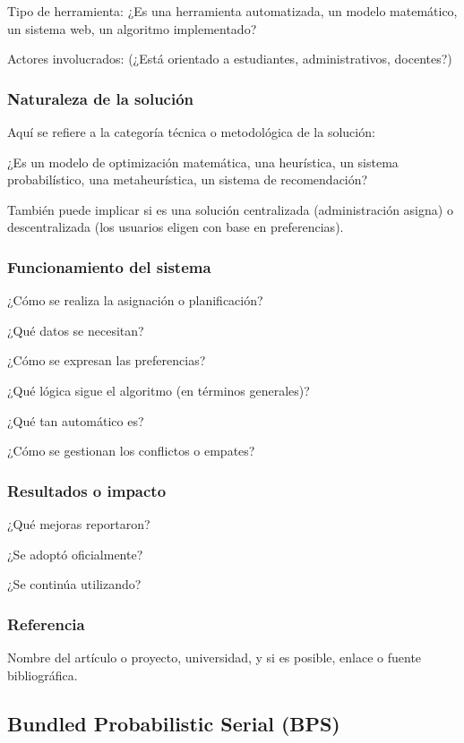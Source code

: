 \documentclass{article}
\begin{document}
Tipo de herramienta: ¿Es una herramienta automatizada, un modelo matemático, un sistema web, un algoritmo implementado?

Actores involucrados: (¿Está orientado a estudiantes, administrativos, docentes?)

\subsubsection{Naturaleza de la solución}
Aquí se refiere a la categoría técnica o metodológica de la solución:

¿Es un modelo de optimización matemática, una heurística, un sistema probabilístico, una metaheurística, un sistema de recomendación?

También puede implicar si es una solución centralizada (administración asigna) o descentralizada (los usuarios eligen con base en preferencias).

\subsubsection{Funcionamiento del sistema}
¿Cómo se realiza la asignación o planificación?

¿Qué datos se necesitan?

¿Cómo se expresan las preferencias?

¿Qué lógica sigue el algoritmo (en términos generales)?

¿Qué tan automático es?

¿Cómo se gestionan los conflictos o empates?

\subsubsection{Resultados o impacto}
¿Qué mejoras reportaron?

¿Se adoptó oficialmente?

¿Se continúa utilizando?

\subsubsection{Referencia}
Nombre del artículo o proyecto, universidad, y si es posible, enlace o fuente bibliográfica.

\subsection{Bundled Probabilistic Serial (BPS)}
\end{document}
